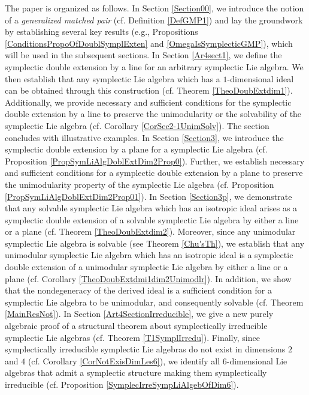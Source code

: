 \documentclass[final,1p,times,nopreprintline]{elsarticle}
\theoremstyle{definition}
\numberwithin{equation}{section}
\numberwithin{equation}{section}
\begin{document}
The paper is organized as follows. In Section \ref{Section00}, we introduce the notion of a \textit{generalized matched pair} (cf. Definition \ref{DefGMP1}) and lay the groundwork by establishing several key results (e.g., Propositions \ref{ConditionsPropoOfDoublSymplExten} and \ref{OmegaIsSymplecticGMP}), which will be used in the subsequent sections. In Section \ref{Ar4sect1}, we define the symplectic double extension by a line for an arbitrary symplectic Lie algebra. We then establish that any symplectic Lie algebra which has a $1$-dimensional ideal can be obtained through this construction (cf. Theorem \ref{TheoDoubExtdim1}). Additionally, we provide necessary and sufficient conditions for the symplectic double extension by a line to preserve the unimodularity or the solvability of the symplectic Lie algebra (cf. Corollary \ref{CorSec2-1UnimSolv}). The section concludes with illustrative examples. In Section \ref{Section3}, we introduce the symplectic double extension by a plane for a symplectic Lie algebra (cf. Proposition \ref{PropSymLiAlgDoblExtDim2Prop0}). Further, we establish necessary and sufficient conditions for a symplectic double extension by a plane to preserve the unimodularity property of the symplectic Lie algebra (cf. Proposition \ref{PropSymLiAlgDoblExtDim2Prop01}). In Section \ref{Section3p}, we demonstrate that any solvable symplectic Lie algebra which has an isotropic ideal arises as a symplectic double extension of a solvable symplectic Lie algebra by either a line or a plane (cf. Theorem \ref{TheoDoubExtdim2}). Moreover, since any unimodular symplectic Lie algebra is solvable (see Theorem \ref{Chu'sTh}), we establish that any unimodular symplectic Lie algebra which has an isotropic ideal is a symplectic double extension of a unimodular symplectic Lie algebra by either a line or a plane (cf. Corollary \ref{TheoDoubExtdmi1dim2Unimodlr}). In addition, we show that the nondegeneracy of the derived ideal is a sufficient condition for a symplectic Lie algebra to be unimodular, and consequently solvable (cf. Theorem \ref{MainResNot}). In Section \ref{Art4SectionIrreducible}, we give a new purely algebraic proof of a structural theorem about symplectically irreducible symplectic Lie algebras (cf. Theorem \ref{T1SymplIrredu}). Finally, since symplectically irreducible symplectic Lie algebras do not exist in dimensions $2$ and $4$ (cf. Corollary \ref{CorNotExisDimLes6}), we identify all $6$-dimensional Lie algebras that admit a symplectic structure making them symplectically irreducible (cf. Proposition \ref{SymplecIrreSympLiAlgebOfDim6}).\\
\end{document}
